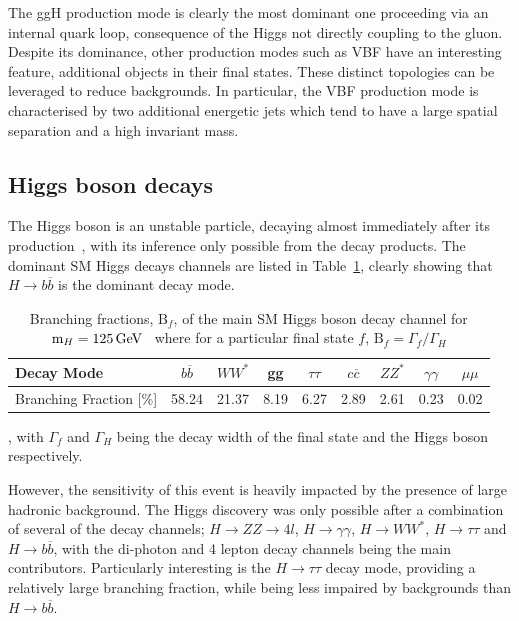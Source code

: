 The ggH production mode is clearly the most dominant one proceeding via an internal quark loop, consequence of the Higgs not directly coupling to the gluon. Despite its dominance, other production modes such as VBF have an interesting feature, additional objects in their final states. These distinct topologies can be leveraged to reduce backgrounds. In particular, the VBF production mode is characterised by two additional energetic jets which tend to have a large spatial separation and a high invariant mass.

\subsection{Higgs boson decays}

The Higgs boson is an unstable particle, decaying almost immediately after its production~\cite{HiggsUnstable}, with its inference only possible from the decay products. The dominant SM Higgs decays channels are listed in Table~\ref{Table:Introduction_HiggsBranchingFractions}, clearly showing that $H\rightarrow b\overline{b}$ is the dominant decay mode. 

\begin{table}[h]
\begin{tabular}{l|c|c|c|c|c|c|c|c}
\hline
Decay Mode                  & $b\overline{b}$    & $WW^*$    & gg   & $\tau\tau$   & $c\overline{c}$   & $ZZ^*$      & $\gamma\gamma$ & $\mu\mu$ \\ \hline
Branching Fraction {[}\%{]} & 58.24 & 21.37 & 8.19 & 6.27 & 2.89 & 2.61 & 0.23                            & 0.02
\end{tabular}
\caption{Branching fractions, $\text{B}_f$, of the main SM Higgs boson decay channel for $\text{m}_H = 125\,\text{Ge\hspace{-.08em}V}$~\cite{HiggsProduction_XS} where for a particular final state $f$, $\text{B}_f = \Gamma_f/\Gamma_H$}, with $\Gamma_f$ and $\Gamma_H$ being the decay width of the final state and the Higgs boson respectively.

\label{Table:Introduction_HiggsBranchingFractions}
\end{table}

However, the sensitivity of this event is heavily impacted by the presence of large hadronic background. The Higgs discovery was only possible after a combination of several of the decay channels; $H\rightarrow ZZ \rightarrow 4l$, $H\rightarrow \gamma \gamma$, $H\rightarrow WW^*$, $H\rightarrow \tau\tau$ and $H\rightarrow b\overline{b}$, with the di-photon and 4 lepton decay channels being the main contributors. Particularly interesting is the $H\rightarrow \tau\tau$ decay mode, providing a relatively large branching fraction, while being less impaired by backgrounds than $H\rightarrow b\overline{b}$.
